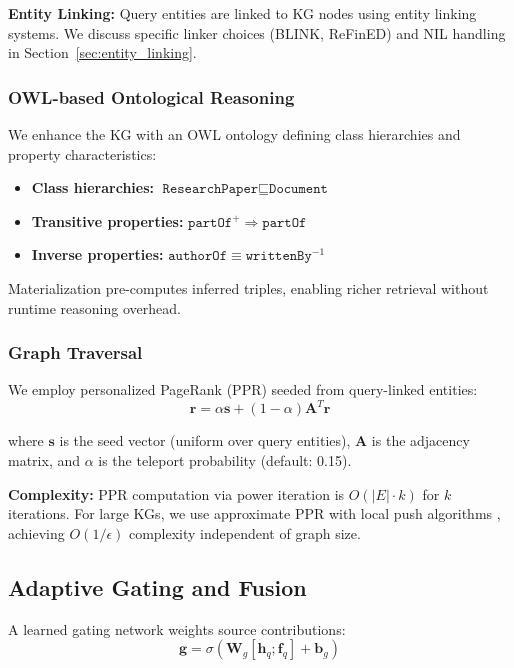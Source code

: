 \documentclass[11pt,a4paper]{article}
\begin{document}
\textbf{Entity Linking:} Query entities are linked to KG nodes using entity linking systems. We discuss specific linker choices (BLINK, ReFinED) and NIL handling in Section~\ref{sec:entity_linking}.

\subsubsection{OWL-based Ontological Reasoning}

We enhance the KG with an OWL ontology defining class hierarchies and property characteristics:
\begin{itemize}
    \item \textbf{Class hierarchies:} $\texttt{ResearchPaper} \sqsubseteq \texttt{Document}$
    \item \textbf{Transitive properties:} $\texttt{partOf}^+ \Rightarrow \texttt{partOf}$
    \item \textbf{Inverse properties:} $\texttt{authorOf} \equiv \texttt{writtenBy}^{-1}$
\end{itemize}

Materialization pre-computes inferred triples, enabling richer retrieval without runtime reasoning overhead.

\subsubsection{Graph Traversal}

We employ personalized PageRank (PPR) seeded from query-linked entities:
\begin{equation}
\mathbf{r} = \alpha \mathbf{s} + (1 - \alpha) \mathbf{A}^T \mathbf{r}
\end{equation}

where $\mathbf{s}$ is the seed vector (uniform over query entities), $\mathbf{A}$ is the adjacency matrix, and $\alpha$ is the teleport probability (default: 0.15).

\textbf{Complexity:} PPR computation via power iteration is $O(|E| \cdot k)$ for $k$ iterations. For large KGs, we use approximate PPR with local push algorithms \citep{andersen2006local}, achieving $O(1/\epsilon)$ complexity independent of graph size.

\subsection{Adaptive Gating and Fusion}
\label{sec:gating}

A learned gating network weights source contributions:
\begin{equation}
\mathbf{g} = \sigma(\mathbf{W}_g [\mathbf{h}_q; \mathbf{f}_q] + \mathbf{b}_g)
\end{equation}
\end{document}
